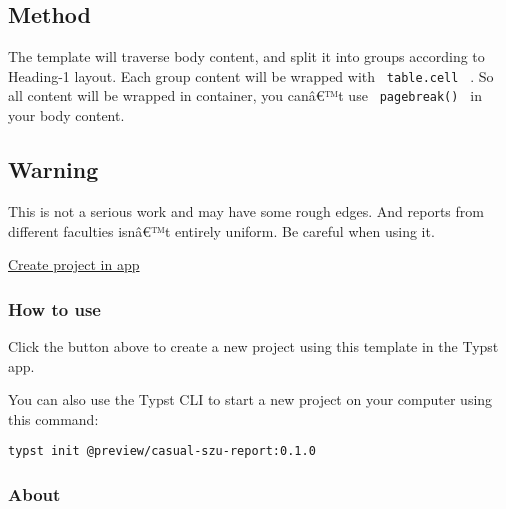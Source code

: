 \subsection{Method}\label{method}

The template will traverse body content, and split it into groups
according to Heading-1 layout. Each group content will be wrapped with
\texttt{\ table.cell\ } . So all content will be wrapped in container,
you canâ€™t use \texttt{\ pagebreak()\ } in your body content.

\subsection{Warning}\label{warning}

This is not a serious work and may have some rough edges. And reports
from different faculties isnâ€™t entirely uniform. Be careful when using
it.

\href{/app?template=casual-szu-report&version=0.1.0}{Create project in
app}

\subsubsection{How to use}\label{how-to-use}

Click the button above to create a new project using this template in
the Typst app.

You can also use the Typst CLI to start a new project on your computer
using this command:

\begin{verbatim}
typst init @preview/casual-szu-report:0.1.0
\end{verbatim}



\subsubsection{About}\label{about}


